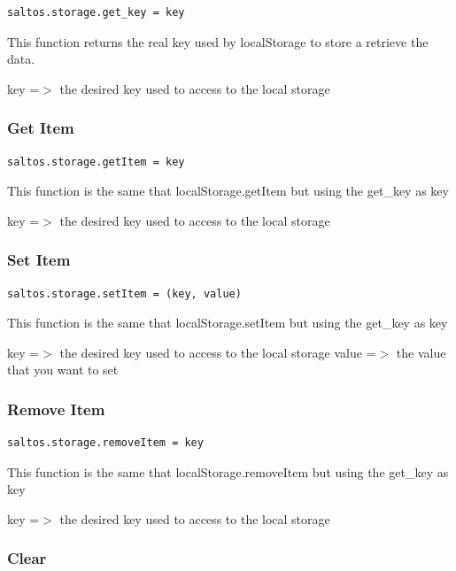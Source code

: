 \documentclass[a4paper]{article}
\begin{document}
\begin{lstlisting}
saltos.storage.get_key = key
\end{lstlisting}

This function returns the real key used by localStorage to store a retrieve
the data.

key =$>$ the desired key used to access to the local storage

\hypertarget{toc292}{}
\subsubsection{Get Item}

\begin{lstlisting}
saltos.storage.getItem = key
\end{lstlisting}

This function is the same that localStorage.getItem but using the get\_key as key

key =$>$ the desired key used to access to the local storage

\hypertarget{toc293}{}
\subsubsection{Set Item}

\begin{lstlisting}
saltos.storage.setItem = (key, value)
\end{lstlisting}

This function is the same that localStorage.setItem but using the get\_key as key

key   =$>$ the desired key used to access to the local storage
value =$>$ the value that you want to set

\hypertarget{toc294}{}
\subsubsection{Remove Item}

\begin{lstlisting}
saltos.storage.removeItem = key
\end{lstlisting}

This function is the same that localStorage.removeItem but using the get\_key as key

key =$>$ the desired key used to access to the local storage

\hypertarget{toc295}{}
\subsubsection{Clear}
\end{document}
